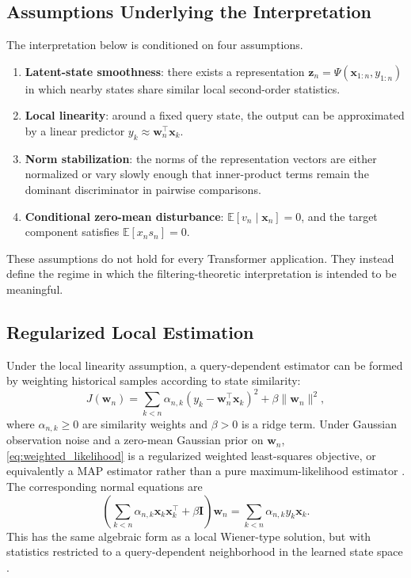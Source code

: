 \documentclass[conference]{IEEEtran}
\begin{document}
\subsection{Assumptions Underlying the Interpretation}
The interpretation below is conditioned on four assumptions.
\begin{enumerate}
    \item \textbf{Latent-state smoothness}: there exists a representation $\mathbf{z}_n=\Psi(\mathbf{x}_{1:n},y_{1:n})$ in which nearby states share similar local second-order statistics.
    \item \textbf{Local linearity}: around a fixed query state, the output can be approximated by a linear predictor $y_k \approx \mathbf{w}_n^\top \mathbf{x}_k$.
    \item \textbf{Norm stabilization}: the norms of the representation vectors are either normalized or vary slowly enough that inner-product terms remain the dominant discriminator in pairwise comparisons.
    \item \textbf{Conditional zero-mean disturbance}: $\mathbb{E}[v_n \mid \mathbf{x}_n]=0$, and the target component satisfies $\mathbb{E}[x_n s_n]=0$.
\end{enumerate}
These assumptions do not hold for every Transformer application. They instead define the regime in which the filtering-theoretic interpretation is intended to be meaningful.

\subsection{Regularized Local Estimation}
Under the local linearity assumption, a query-dependent estimator can be formed by weighting historical samples according to state similarity:
\begin{equation}
J(\mathbf{w}_n) = \sum_{k<n} \alpha_{n,k}\left(y_k-\mathbf{w}_n^\top \mathbf{x}_k\right)^2 + \beta \|\mathbf{w}_n\|^2,
\label{eq:weighted_likelihood}
\end{equation}
where $\alpha_{n,k} \ge 0$ are similarity weights and $\beta>0$ is a ridge term. Under Gaussian observation noise and a zero-mean Gaussian prior on $\mathbf{w}_n$, \eqref{eq:weighted_likelihood} is a regularized weighted least-squares objective, or equivalently a MAP estimator rather than a pure maximum-likelihood estimator \cite{hoerl1970ridge, bishop2006pattern}. The corresponding normal equations are
\begin{equation}
\left(\sum_{k<n}\alpha_{n,k}\mathbf{x}_k\mathbf{x}_k^\top + \beta \mathbf{I}\right)\mathbf{w}_n
= \sum_{k<n}\alpha_{n,k}y_k\mathbf{x}_k.
\label{eq:dynamic_wiener_sol}
\end{equation}
This has the same algebraic form as a local Wiener-type solution, but with statistics restricted to a query-dependent neighborhood in the learned state space \cite{wiener1949extrapolation}.
\end{document}
